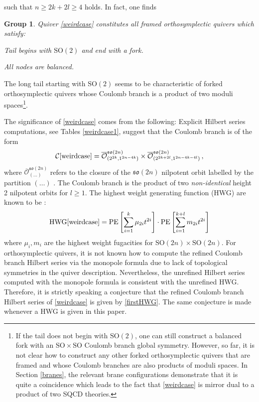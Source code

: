 \documentclass[a4paper,11pt]{article}
\newtheorem{myrule}{Group}
\newcommand{\sorm}{\mathrm{SO}}
\newcommand{\HWG}{\mathrm{HWG}}
\newcommand{\PE}{\mathrm{PE}}
\begin{document}
such that  $n\geq 2k+2l \geq 4$ holds. In fact, one finds
\begin{tcolorbox}
\begin{myrule}\label{rule:framed_D}
Quiver \eqref{weirdcase} constitutes all \emph{framed} orthosymplectic quivers which satisfy: 
\begin{compactitem}
    \item Tail begins with $\sorm(2)$ and end with a fork.  
    \item All nodes are balanced. 
\end{compactitem}
\end{myrule}
\end{tcolorbox}
\noindent
The long tail starting with $\sorm(2)$ seems to be characteristic of forked orthosymplectic quivers whose Coulomb branch is a product of two moduli spaces\footnote{If the tail does not begin with $\sorm(2)$, one can still construct a balanced fork with an $\mathrm{SO}\times \mathrm{SO}$ Coulomb branch global symmetry. However, so far, it is not clear how to construct any other forked orthosymplectic quivers that are framed and whose Coulomb branches are also products of moduli spaces.  In Section \ref{branes}, the relevant brane configurations demonstrate that it is quite a coincidence which leads to the fact that \eqref{weirdcase} is mirror dual to a product of two SQCD theories.}.

The significance of \eqref{weirdcase} comes from the following:
 Explicit Hilbert series computations, see Tables \ref{weirdcase1}, suggest that the Coulomb branch is of the form
\begin{equation}
    \mathcal{C}\eqref{weirdcase} = \overline{\mathcal{O}}^{\mathfrak{so}(2n)}_{(2^{2k},1^{2n-4k})}\times \overline{\mathcal{O}}^{\mathfrak{so}(2n)}_{(2^{2k+2l},1^{2n-4k-4l})} \,,
    \label{modulispaceprodeqn}
\end{equation}
where $\overline{\mathcal{O}}^{\mathfrak{so}(2n)}_{(\dots)}$ refers to the closure of the $\mathfrak{so}(2n)$ nilpotent orbit labelled by the partition $(\dots)$ \cite{Collingwood:1993fk}.  The Coulomb branch is the product of two \emph{non-identical} height 2 nilpotent orbits for $l\geq 1$. The highest weight generating function (HWG) are known to be \cite{Hanany:2016gbz}:
\begin{equation}
     \HWG\eqref{weirdcase} 
    =\PE\left[\sum_{i=1}^k \mu_{2i}t^{2i} \right]\cdot
    \PE\left[\sum_{i=1}^{k+l} m_{2i} t^{2i}\right]
    \label{firstHWG}
\end{equation}
 where $\mu_i, m_i$ are the highest weight fugacities for $\sorm(2n)\times \sorm(2n)$. For orthosymplectic quivers, it is not known how to compute the refined Coulomb branch Hilbert series via the monopole formula due to lack of topological symmetries in the quiver description. Nevertheless, the unrefined Hilbert series computed with the monopole formula is consistent with the unrefined HWG. Therefore, it is strictly speaking a conjecture that the refined Coulomb branch Hilbert series of \eqref{weirdcase} is given by \eqref{firstHWG}. The same conjecture is made whenever a HWG is given in this paper.
\end{document}
